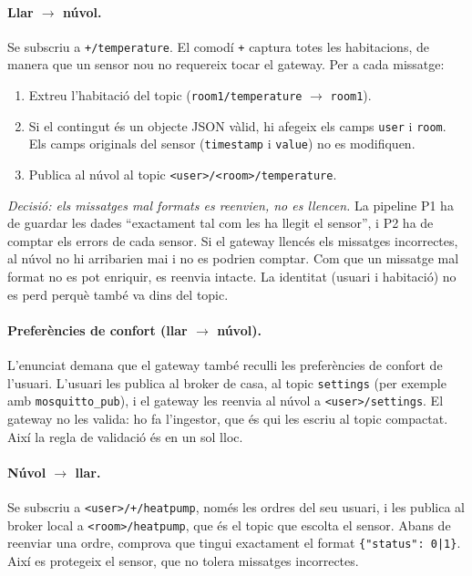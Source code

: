 \documentclass[11pt,a4paper]{article}
\begin{document}
\paragraph{Llar $\rightarrow$ núvol.}
Se subscriu a \texttt{+/temperature}. El comodí \texttt{+} captura totes les
habitacions, de manera que un sensor nou no requereix tocar el gateway. Per a
cada missatge:
\begin{enumerate}
  \item Extreu l'habitació del topic (\texttt{room1/temperature}
        $\rightarrow$ \texttt{room1}).
  \item Si el contingut és un objecte JSON vàlid, hi afegeix els camps
        \texttt{user} i \texttt{room}. Els camps originals del sensor
        (\texttt{timestamp} i \texttt{value}) no es modifiquen.
  \item Publica al núvol al topic \texttt{<user>/<room>/temperature}.
\end{enumerate}

\emph{Decisió: els missatges mal formats es reenvien, no es llencen.} La
pipeline P1 ha de guardar les dades ``exactament tal com les ha llegit el
sensor'', i P2 ha de comptar els errors de cada sensor. Si el gateway llencés
els missatges incorrectes, al núvol no hi arribarien mai i no es podrien
comptar. Com que un missatge mal format no es pot enriquir, es reenvia
intacte. La identitat (usuari i habitació) no es perd perquè també va dins
del topic.

\paragraph{Preferències de confort (llar $\rightarrow$ núvol).}
L'enunciat demana que el gateway també reculli les preferències de confort de
l'usuari. L'usuari les publica al broker de casa, al topic \texttt{settings}
(per exemple amb \texttt{mosquitto\_pub}), i el gateway les reenvia al núvol a
\texttt{<user>/settings}. El gateway no les valida: ho fa l'ingestor, que és
qui les escriu al topic compactat. Així la regla de validació és en un sol
lloc.

\paragraph{Núvol $\rightarrow$ llar.}
Se subscriu a \texttt{<user>/+/heatpump}, només les ordres del seu usuari, i
les publica al broker local a \texttt{<room>/heatpump}, que és el topic que
escolta el sensor. Abans de reenviar una ordre, comprova que tingui
exactament el format \texttt{\{"status": 0|1\}}. Així es protegeix el sensor,
que no tolera missatges incorrectes.
\end{document}
